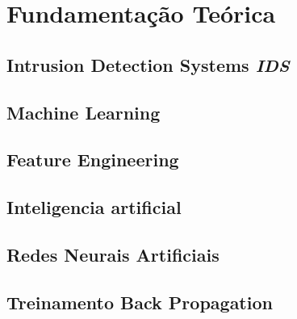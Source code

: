 \chapter[Fundamentação Teórica]{Fundamentação Teórica}

\section{Intrusion Detection Systems \textit{IDS}}

\section{Machine Learning}
    \section{Feature Engineering}

\section{Inteligencia artificial}
    \section{Redes Neurais Artificiais}

    \section{Treinamento Back Propagation}
